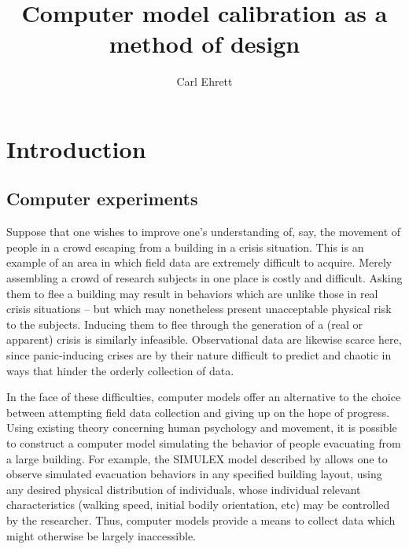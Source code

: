 \documentclass{article}
\author{Carl Ehrett}
\title{Computer model calibration as a method of design}
\begin{document}
\maketitle

\section{Introduction} \label{introduction}

\subsection{Computer experiments} \label{computer_experiments}

Suppose that one wishes to improve one's understanding of, say, the movement of people in a crowd escaping from a building in a crisis situation. This is an example of an area in which field data are extremely difficult to acquire. Merely assembling a crowd of research subjects in one place is costly and difficult. Asking them to flee a building may result in behaviors which are unlike those in real crisis situations -- but which may nonetheless present unacceptable physical risk to the subjects. Inducing them to flee through the generation of a (real or apparent) crisis is similarly infeasible. Observational data are likewise scarce here, since panic-inducing crises are by their nature difficult to predict and chaotic in ways that hinder the orderly collection of data.

In the face of these difficulties, computer models offer an alternative to the choice between attempting field data collection and giving up on the hope of progress. Using existing theory concerning human psychology and movement, it is possible to construct a computer model simulating the behavior of people evacuating from a large building. For example, the SIMULEX model described by \cite{Thompson1995} allows one to observe simulated evacuation behaviors in any specified building layout, using any desired physical distribution of individuals, whose individual relevant characteristics (walking speed, initial bodily orientation, etc) may be controlled by the researcher. Thus, computer models provide a means to collect data which might otherwise be largely inaccessible. 
\end{document}
